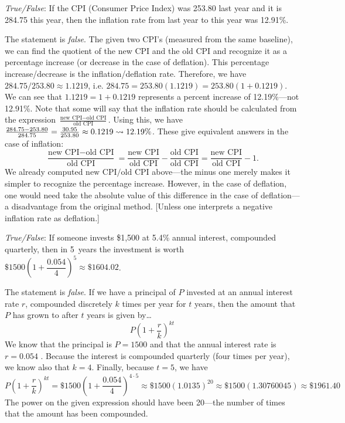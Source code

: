 \documentclass[11pt,letterpaper]{article}
\begin{document}
\quizsol \textit{True/False}: If the CPI (Consumer Price Index) was 253.80 last year and it is 284.75 this year, then the inflation rate from last year to this year was 12.91\%. \pspace

\sol The statement is \textit{false}. The given two CPI's (measured from the same baseline), we can find the quotient of the new CPI and the old CPI and recognize it as a percentage increase (or decrease in the case of deflation). This percentage increase/decrease is the inflation/deflation rate. Therefore, we have $284.75/253.80 \approx 1.1219$, i.e. $284.75= 253.80(1.1219)= 253.80(1 + 0.1219)$. We can see that $1.1219= 1 + 0.1219$ represents a percent increase of 12.19\%---not 12.91\%. Note that some will say that the inflation rate should be calculated from the expression $\frac{\text{new CPI} - \text{old CPI}}{\text{old CPI}}$. Using this, we have $\frac{284.75 - 253.80}{284.75}= \frac{30.95}{253.80} \approx 0.1219 \rightsquigarrow 12.19\%$. These give equivalent answers in the case of inflation:
	\[
	\frac{\text{new CPI} - \text{old CPI}}{\text{old CPI}}= \frac{\text{new CPI}}{\text{old CPI}} - \frac{\text{old CPI}}{\text{old CPI}}= \frac{\text{new CPI}}{\text{old CPI}} - 1.
	\]
We already computed $\text{new CPI}/\text{old CPI}$ above---the minus one merely makes it simpler to recognize the percentage increase. However, in the case of deflation, one would need take the absolute value of this difference in the case of deflation---a disadvantage from the original method. [Unless one interprets a negative inflation rate as deflation.] \pvspace{1.5cm}



\quizsol \textit{True/False}: If someone invests \$1,500 at 5.4\% annual interest, compounded quarterly, then in 5~years the investment is worth $\$1500 \left( 1 + \dfrac{0.054}{4} \right)^5 \approx \$1604.02$. \pspace

\sol The statement is \textit{false}. If we have a principal of $P$ invested at an annual interest rate $r$, compounded discretely $k$ times per year for $t$ years, then the amount that $P$ has grown to after $t$ years is given by\dots
	\[
	P \left( 1 + \dfrac{r}{k} \right)^{kt}
	\]
We know that the principal is $P= 1500$ and that the annual interest rate is $r= 0.054$ . Because the interest is compounded quarterly (four times per year), we know also that $k= 4$. Finally, because $t= 5$, we have
	\[
	P \left( 1 + \dfrac{r}{k} \right)^{kt}= \$1500 \left( 1 + \dfrac{0.054}{4} \right)^{4 \cdot 5} \approx \$1500 (1.0135)^{20} \approx \$1500(1.30760045) \approx \$1961.40
	\]
The power on the given expression should have been 20---the number of times that the amount has been compounded. \pvspace{1.5cm}
\end{document}
